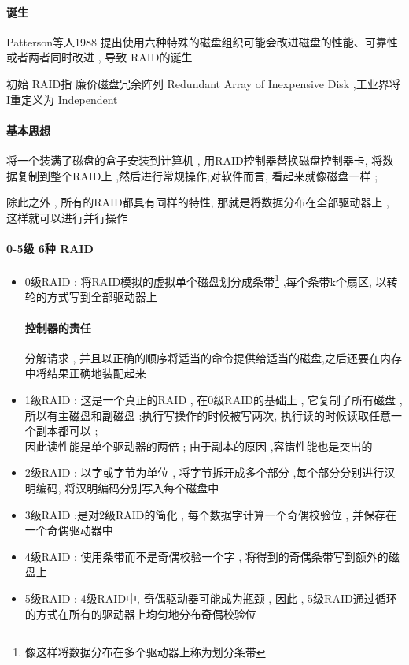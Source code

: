 \documentclass[UTF8,a4paper]{ctexart}
\begin{document}
\paragraph{诞生} Patterson等人1988 提出使用六种特殊的磁盘组织可能会改进磁盘的性能、可靠性或者两者同时改进 , 导致 RAID的诞生

初始 RAID指 廉价磁盘冗余阵列 Redundant Array of Inexpensive Disk  ,工业界将I重定义为 Independent

\paragraph{基本思想} 将一个装满了磁盘的盒子安装到计算机 , 用RAID控制器替换磁盘控制器卡, 将数据复制到整个RAID上 ,然后进行常规操作;对软件而言, 看起来就像磁盘一样 ; 

除此之外 , 所有的RAID都具有同样的特性, 那就是将数据分布在全部驱动器上 , 这样就可以进行并行操作

\paragraph{0-5级 6种 RAID}
\begin{itemize}
	\item 0级RAID : 将RAID模拟的虚拟单个磁盘划分成条带\footnote{像这样将数据分布在多个驱动器上称为划分条带} ,每个条带k个扇区, 以转轮的方式写到全部驱动器上
	\paragraph{控制器的责任} 分解请求 , 并且以正确的顺序将适当的命令提供给适当的磁盘,之后还要在内存中将结果正确地装配起来
	
	\item 1级RAID : 这是一个真正的RAID , 在0级RAID的基础上 , 它复制了所有磁盘 , 所以有主磁盘和副磁盘 ;执行写操作的时候被写两次, 执行读的时候读取任意一个副本都可以 ; 
	\\因此读性能是单个驱动器的两倍 ; 由于副本的原因 ,容错性能也是突出的

	\item 2级RAID : 以字或字节为单位 , 将字节拆开成多个部分 ,每个部分分别进行汉明编码, 将汉明编码分别写入每个磁盘中
	\item 3级RAID :是对2级RAID的简化 , 每个数据字计算一个奇偶校验位 , 并保存在一个奇偶驱动器中
	\item 4级RAID : 使用条带而不是奇偶校验一个字 , 将得到的奇偶条带写到额外的磁盘上
	\item 5级RAID : 4级RAID中, 奇偶驱动器可能成为瓶颈 , 因此 , 5级RAID通过循环的方式在所有的驱动器上均匀地分布奇偶校验位
\end{itemize}
\end{document}
